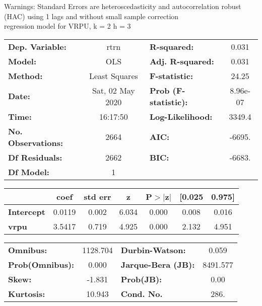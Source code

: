 Warnings: \newline
 [1] Standard Errors are heteroscedasticity and autocorrelation robust (HAC) using 1 lags and without small sample correction\\ 

regression model for VRPU, k = 2 h = 3\begin{center}
\begin{tabular}{lclc}
\toprule
\textbf{Dep. Variable:}    &       rtrn       & \textbf{  R-squared:         } &     0.031   \\
\textbf{Model:}            &       OLS        & \textbf{  Adj. R-squared:    } &     0.031   \\
\textbf{Method:}           &  Least Squares   & \textbf{  F-statistic:       } &     24.25   \\
\textbf{Date:}             & Sat, 02 May 2020 & \textbf{  Prob (F-statistic):} &  8.96e-07   \\
\textbf{Time:}             &     16:17:50     & \textbf{  Log-Likelihood:    } &    3349.4   \\
\textbf{No. Observations:} &        2664      & \textbf{  AIC:               } &    -6695.   \\
\textbf{Df Residuals:}     &        2662      & \textbf{  BIC:               } &    -6683.   \\
\textbf{Df Model:}         &           1      & \textbf{                     } &             \\
\bottomrule
\end{tabular}
\begin{tabular}{lcccccc}
                   & \textbf{coef} & \textbf{std err} & \textbf{z} & \textbf{P$> |$z$|$} & \textbf{[0.025} & \textbf{0.975]}  \\
\midrule
\textbf{Intercept} &       0.0119  &        0.002     &     6.034  &         0.000        &        0.008    &        0.016     \\
\textbf{vrpu}      &       3.5417  &        0.719     &     4.925  &         0.000        &        2.132    &        4.951     \\
\bottomrule
\end{tabular}
\begin{tabular}{lclc}
\textbf{Omnibus:}       & 1128.704 & \textbf{  Durbin-Watson:     } &    0.059  \\
\textbf{Prob(Omnibus):} &   0.000  & \textbf{  Jarque-Bera (JB):  } & 8491.577  \\
\textbf{Skew:}          &  -1.831  & \textbf{  Prob(JB):          } &     0.00  \\
\textbf{Kurtosis:}      &  10.943  & \textbf{  Cond. No.          } &     286.  \\
\bottomrule
\end{tabular}
\end{center}

